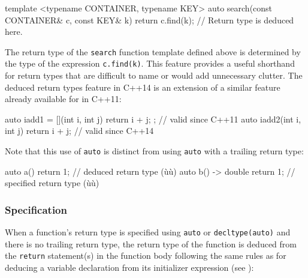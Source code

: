 \begin{emcppslisting}
template <typename CONTAINER, typename KEY>
auto search(const CONTAINER& c, const KEY& k)
{
    return c.find(k);  // Return type is deduced here.
}
\end{emcppslisting}
    

\noindent The return type of the \lstinline!search! function template defined above
is determined by the type of the expression \lstinline!c.find(k)!. This
feature provides a useful shorthand for return types that are difficult
to name or would add unnecessary clutter. The deduced return types
feature in C++14 is an extension of a similar feature already available
for  in C++11:

\begin{emcppslisting}
auto iadd1 = [](int i, int j) { return i + j; };  // valid since C++11
auto iadd2(int i, int j)      { return i + j; }   // valid since C++14
\end{emcppslisting}
    

\noindent Note that this use of \lstinline!auto! is distinct from using \lstinline!auto!
with a trailing return type:

\begin{emcppslisting}
auto a()           { return 1; }  // deduced return type (ù{}ù)
auto b() -> double { return 1; }  // specified return type (ù{}ù)
\end{emcppslisting}
    

\subsubsection[Specification]{Specification}\label{specification}

When a function's return type is specified using \lstinline!auto! or
\lstinline!decltype(auto)! and there is no trailing return type, the return
type of the function is deduced from the \lstinline!return! statement(s) in
the function body following the same rules as for deducing a variable
declaration from its initializer expression (see ):


